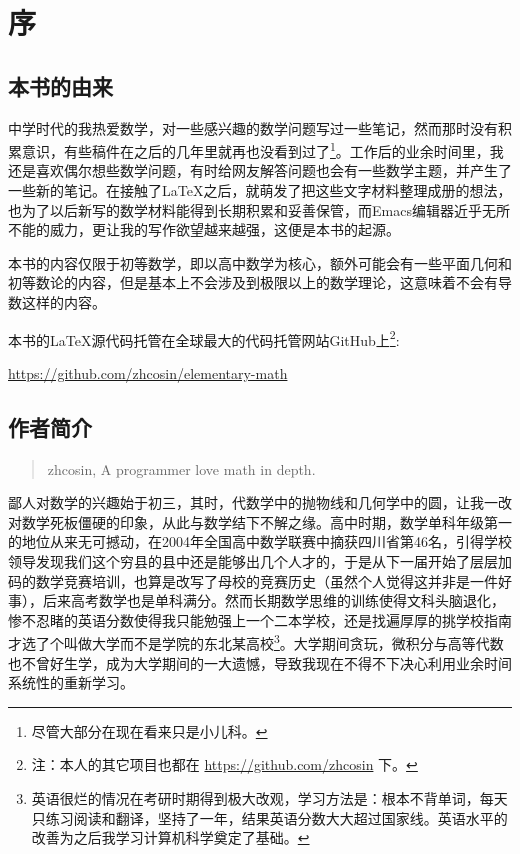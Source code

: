 
\chapter*{序}


\section{本书的由来}

中学时代的我热爱数学，对一些感兴趣的数学问题写过一些笔记，然而那时没有积累意识，有些稿件在之后的几年里就再也没看到过了\footnote{尽管大部分在现在看来只是小儿科。}。工作后的业余时间里，我还是喜欢偶尔想些数学问题，有时给网友解答问题也会有一些数学主题，并产生了一些新的笔记。在接触了LaTeX之后，就萌发了把这些文字材料整理成册的想法，也为了以后新写的数学材料能得到长期积累和妥善保管，而Emacs编辑器近乎无所不能的威力，更让我的写作欲望越来越强，这便是本书的起源。

本书的内容仅限于初等数学，即以高中数学为核心，额外可能会有一些平面几何和初等数论的内容，但是基本上不会涉及到极限以上的数学理论，这意味着不会有导数这样的内容。

本书的LaTeX源代码托管在全球最大的代码托管网站GitHub上\footnote{注：本人的其它项目也都在 \href{https://github.com/zhcosin}{https://github.com/zhcosin} 下。}:
\begin{center}
\href{https://github.com/zhcosin/elementary-math}{https://github.com/zhcosin/elementary-math}
\end{center}

\section{作者简介}
\begin{quotation}
zhcosin, A programmer love math in depth.
\end{quotation}

鄙人对数学的兴趣始于初三，其时，代数学中的抛物线和几何学中的圆，让我一改对数学死板僵硬的印象，从此与数学结下不解之缘。高中时期，数学单科年级第一的地位从来无可撼动，在2004年全国高中数学联赛中摘获四川省第46名，引得学校领导发现我们这个穷县的县中还是能够出几个人才的，于是从下一届开始了层层加码的数学竞赛培训，也算是改写了母校的竞赛历史（虽然个人觉得这并非是一件好事），后来高考数学也是单科满分。然而长期数学思维的训练使得文科头脑退化，惨不忍睹的英语分数使得我只能勉强上一个二本学校，还是找遍厚厚的挑学校指南才选了个叫做大学而不是学院的东北某高校\footnote{英语很烂的情况在考研时期得到极大改观，学习方法是：根本不背单词，每天只练习阅读和翻译，坚持了一年，结果英语分数大大超过国家线。英语水平的改善为之后我学习计算机科学奠定了基础。}。大学期间贪玩，微积分与高等代数也不曾好生学，成为大学期间的一大遗憾，导致我现在不得不下决心利用业余时间系统性的重新学习。

